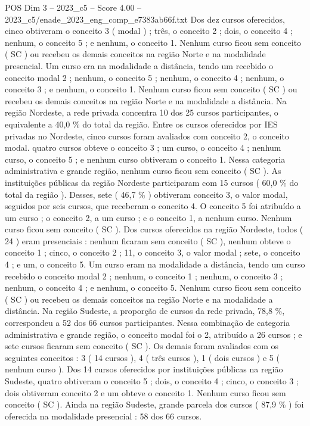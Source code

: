 \begin{textsample}{POS Dim 3 – 2023\_c5 – Score 4.00 – 2023\_c5/enade\_2023\_eng\_comp\_e7383ab66f.txt}
Dos dez cursos oferecidos, cinco obtiveram o conceito 3 ( modal ) ; três, o conceito 2 ; dois, o conceito 4 ; nenhum, o conceito 5 ; e nenhum, o conceito 1.
Nenhum curso ficou sem conceito ( SC ) ou recebeu os demais conceitos na região Norte e na modalidade presencial.
Um curso era na modalidade a distância, tendo um recebido o conceito modal 2 ; nenhum, o conceito 5 ; nenhum, o conceito 4 ; nenhum, o conceito 3 ; e nenhum, o conceito 1.
Nenhum curso ficou sem conceito ( SC ) ou recebeu os demais conceitos na região Norte e na modalidade a distância.
Na região Nordeste, a rede privada concentra 10 dos 25 cursos participantes, o equivalente a 40,0 \% do total da região.
Entre os cursos oferecidos por IES privadas no Nordeste, cinco cursos foram avaliados com conceito 2, o conceito modal. quatro cursos obteve o conceito 3 ; um curso, o conceito 4 ; nenhum curso, o conceito 5 ; e nenhum curso obtiveram o conceito 1.
Nessa categoria administrativa e grande região, nenhum curso ficou sem conceito ( SC ).
As instituições públicas da região Nordeste participaram com 15 cursos ( 60,0 \% do total da região ).
Desses, sete ( 46,7 \% ) obtiveram conceito 3, o valor modal, seguidos por seis cursos, que receberam o conceito 4.
O conceito 5 foi atribuído a um curso ; o conceito 2, a um curso ; e o conceito 1, a nenhum curso.
Nenhum curso ficou sem conceito ( SC ).
Dos cursos oferecidos na região Nordeste, todos ( 24 ) eram presenciais : nenhum ficaram sem conceito ( SC ), nenhum obteve o conceito 1 ; cinco, o conceito 2 ; 11, o conceito 3, o valor modal ; sete, o conceito 4 ; e um, o conceito 5.
Um curso eram na modalidade a distância, tendo um curso recebido o conceito modal 2 ; nenhum, o conceito 1 ; nenhum, o conceito 3 ; nenhum, o conceito 4 ; e nenhum, o conceito 5.
Nenhum curso ficou sem conceito ( SC ) ou recebeu os demais conceitos na região Norte e na modalidade a distância.
Na região Sudeste, a proporção de cursos da rede privada, 78,8 \%, correspondeu a 52 dos 66 cursos participantes.
Nessa combinação de categoria administrativa e grande região, o conceito modal foi o 2, atribuído a 26 cursos ; e sete cursos ficaram sem conceito ( SC ).
Os demais foram avaliados com os seguintes conceitos : 3 ( 14 cursos ), 4 ( três cursos ), 1 ( dois cursos ) e 5 ( nenhum curso ).
Dos 14 cursos oferecidos por instituições públicas na região Sudeste, quatro obtiveram o conceito 5 ; dois, o conceito 4 ; cinco, o conceito 3 ; dois obtiveram conceito 2 e um obteve o conceito 1.
Nenhum curso ficou sem conceito ( SC ).
Ainda na região Sudeste, grande parcela dos cursos ( 87,9 \% ) foi oferecida na modalidade presencial : 58 dos 66 cursos.

\end{textsample}
